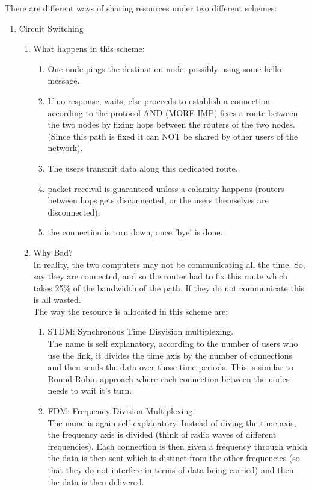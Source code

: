 \documentclass[11pt, a4paper]{article}
\begin{document}
There are different ways of sharing resources under two different schemes:
\begin{enumerate}
    \item Circuit Switching
    \begin{enumerate}
        \item What happens in this scheme:
        \begin{enumerate}
            \item One node pings the destination node, possibly using some hello message.
            \item If no response, waits, else proceeds to establish a connection according to the protocol AND (MORE IMP) fixes a route between the two nodes by fixing hops between the routers of the two nodes. (Since this path is fixed it can NOT be shared by other users of the network).
            \item The users transmit data along this dedicated route.
            \item packet receival is guaranteed unless a calamity happens (routers between hops gets disconnected, or the users themselves are disconnected).
            \item the connection is torn down, once 'bye' is done.
        \end{enumerate}
        \item Why Bad?\\
            In reality, the two computers may not be communicating all the time. So, say they are connected, and so the router had to fix this route which takes 25\% of the bandwidth of the path. If they do not communicate this is all wasted.\\
            The way the resource is allocated in this scheme are:
            \begin{enumerate}
                \item STDM: Synchronous Time Disvision multiplexing.\\
                The name is self explanatory, according to the number of users who use the link, it divides the time axis by the number of connections and then sends the data over those time periods. This is similar to Round-Robin approach where each connection between the nodes needs to wait it's turn.
                \item FDM: Frequency Division Multiplexing.\\
                The name is again self explanatory. Instead of diving the time axis, the frequency axis is divided (think of radio waves of different frequencies). Each connection is then given a frequency through which the data is then sent which is distinct from the other frequencies (so that they do not interfere in terms of data being carried) and then the data is then delivered.

\end{enumerate}
\end{enumerate}
\end{enumerate}
\end{document}
